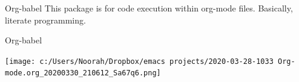 \documentclass[presentation]{beamer}
\begin{document}
\begin{frame}[label={sec:org134bdd5}]{Org-babel}
This package is for code execution within org-mode files. Basically, literate programming.
\end{frame}

\begin{frame}[label={sec:org6dd305d}]{Org-babel}
\begin{center}
\texttt{[image: c:/Users/Noorah/Dropbox/emacs projects/2020-03-28-1033 Org-mode.org\_20200330\_210612\_Sa67q6.png]}
\end{center}
\end{frame}
\end{document}
